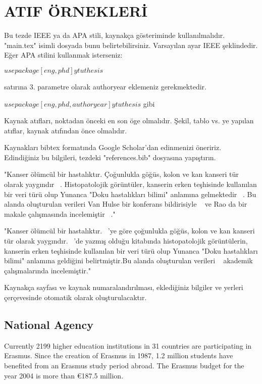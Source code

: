 \chapter{ATIF ÖRNEKLERİ}

Bu tezde IEEE ya da APA stili, kaynakça gösteriminde kullanılmalıdır. "main.tex" isimli dosyada bunu belirtebilirsiniz. Varsayılan ayar IEEE şeklindedir. Eğer APA stilini kullanmak isterseniz:

$usepackage[eng, phd]{ytuthesis}$

satırına 3. parametre olarak authoryear eklemeniz gerekmektedir.

$usepackage[eng, phd, authoryear]{ytuthesis}$ gibi

Kaynak atıfları, noktadan önceki en son öge olmalıdır. Şekil, tablo vs. ye yapılan atıflar, kaynak atıfından önce olmalıdır.

Kaynakları bibtex formatında Google Scholar'dan edinmenizi öneririz. Edindiğiniz bu bilgileri, tezdeki "references.bib" dosyasına yapıştırın.


\if@ieeetrue

"Kanser ölümcül bir hastalıktır. Çoğunlukla göğüs, kolon ve kan kanseri tür olarak yaygındır ~\cite{biopsy}. Histopatolojik görüntüler, kanserin erken teşhisinde kullanılan bir veri türü olup Yunanca "Doku hastalıkları bilimi" anlamına gelmektedir ~\cite{mohan2018textbook}. Bu alanda oluşturulan verileri Van Hulse bir konferans bildirisiyle ~\cite{van2007experimental} ve Rao da bir makale çalışmasında incelemiştir ~\cite{xing2016robust}."

\else
"Kanser ölümcül bir hastalıktır.  ~\parencite{biopsy}'ye göre çoğunlukla göğüs, kolon ve kan kanseri tür olarak yaygındır. ~\parencite{mohan2018textbook}'de yazmış olduğu kitabında histopatolojik görüntülerin, kanserin erken teşhisinde kullanılan bir veri türü olup Yunanca "Doku hastalıkları bilimi" anlamına geldiğini belirtmiştir.Bu alanda oluşturulan verileri ~\parencite{van2007experimental, xing2016robust} akademik çalışmalarında incelemiştir." 
\fi

Kaynakça sayfası ve kaynak numaralandırılması, eklediğiniz bilgiler ve yerleri çerçevesinde otomatik olarak oluşturulacaktır.

\section{National Agency }
Currently 2199 higher education institutions in 31 countries are participating in Erasmus. Since the creation of Erasmus in 1987, 1.2 million students have benefited from an Erasmus study period abroad. The Erasmus budget for the year 2004 is more than \euro 187.5 million.

